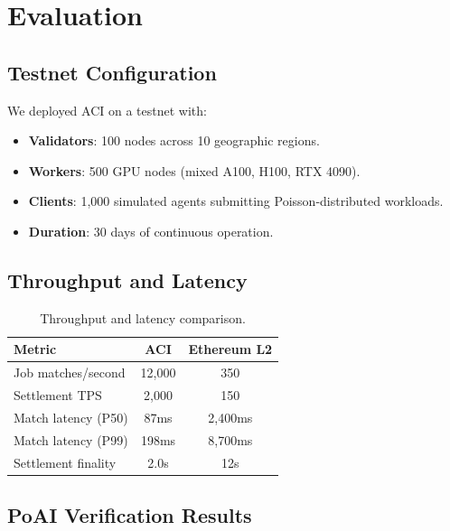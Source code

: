\section{Evaluation}

\label{sec:evaluation}

\subsection{Testnet Configuration}

We deployed ACI on a testnet with:

\begin{itemize}[leftmargin=1.1em]
    \item \textbf{Validators}: 100 nodes across 10 geographic regions.
    \item \textbf{Workers}: 500 GPU nodes (mixed A100, H100, RTX 4090).
    \item \textbf{Clients}: 1,000 simulated agents submitting Poisson-distributed workloads.
    \item \textbf{Duration}: 30 days of continuous operation.
\end{itemize}

\subsection{Throughput and Latency}

\begin{table}[H]
\centering
\small
\begin{tabular}{lcc}
\toprule
\textbf{Metric} & \textbf{ACI} & \textbf{Ethereum L2} \\
\midrule
Job matches/second & 12,000 & 350 \\
Settlement TPS & 2,000 & 150 \\
Match latency (P50) & 87ms & 2,400ms \\
Match latency (P99) & 198ms & 8,700ms \\
Settlement finality & 2.0s & 12s \\
\bottomrule
\end{tabular}
\caption{Throughput and latency comparison.}
\label{tab:throughput}
\end{table}

\subsection{PoAI Verification Results}

